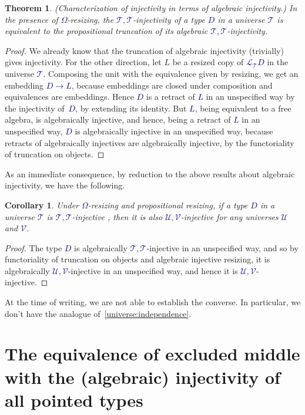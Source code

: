 \documentclass[10pt]{article}
\newcommand{\db}{\textcolor{darkblue}}
\newcommand{\m}[1]{\db{$#1$}}
\newcommand{\U}{\mathcal{U}}
\newcommand{\V}{\mathcal{V}}
\newcommand{\T}{\mathcal{T}}
\newcommand{\Lift}{\mathcal{L}}
\newtheorem{theorem}[numbered]{Theorem}
\newtheorem{corollary}[numbered]{Corollary}
\theoremstyle{definition}
\begin{document}
\begin{theorem} \label{better}
  (Characterization of injectivity in terms of algebraic injectivity.)
  In the presence of \m{\Omega}-resizing, the
  \m{\T,\T}-injectivity of a type \m{D} in a universe \m{\T} is
  equivalent to the propositional truncation of
  its algebraic \m{\T,\T}-injectivity.
\end{theorem}
\begin{proof}
  We already know that the truncation of algebraic injectivity
  (trivially) gives injectivity.  For the other direction, let $L$ be
  a resized copy of \m{\Lift_\T D} in the universe \m{\T}.  Composing
  the unit with the equivalence given by resizing, we get an embedding
  \m{D \to L}, because embeddings are closed under composition and
  equivalences are embeddings.  Hence \m{D} is a retract of \m{L} in
  an unspecified way by the injectivity of~\m{D}, by extending its
  identity.  But \m{L}, being equivalent to a free algebra, is
  algebraically injective, and hence, being a retract of \m{L} in an
  unspecified way, \m{D} is algebraically injective in an unspecified
  way, because retracts of algebraically injectives are algebraically
  injective, by the functoriality of truncation on objects.
\end{proof}

As an immediate consequence, by reduction to the above results about algebraic
injectivity, we have the following.
\begin{corollary}
  Under \m{\Omega}-resizing and propositional resizing, if a type
  \m{D} in a universe \m{\T} is \m{\T,\T}-injective , then it is also
  \m{\U,\V}-injective for any universes \m{\U} and \m{\V}.
\end{corollary}
\begin{proof}
  The type \m{D} is algebraically \m{\T,\T}-injective in an
  unspecified way, and so by functoriality of truncation on objects
  and algebraic injective resizing, it is algebraically
  \m{\U,\V}-injective in an unspecified way, and hence it is
  \m{\U,\V}-injective.
\end{proof}
At the time of writing, we are not able to establish the converse. In
particular, we don't have the analogue of~\ref{universe:independence}.


\section{The equivalence of  excluded middle with the (algebraic) injectivity of all pointed types}
\end{document}
